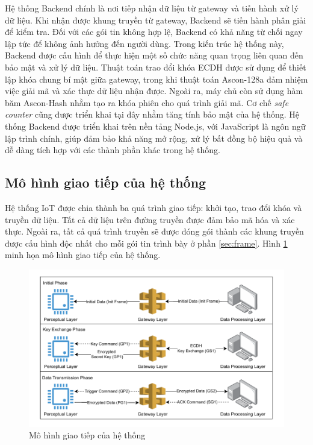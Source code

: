 Hệ thống Backend chính là nơi tiếp nhận dữ liệu từ gateway và tiến hành xử lý dữ liệu. Khi nhận được khung truyền từ gateway, Backend sẽ tiến hành phân giải để kiểm tra. Đối với các gói tin không hợp lệ, Backend có khả năng từ chối ngay lập tức để không ảnh hưởng đến người dùng. Trong kiến trúc hệ thống này, Backend được cấu hình để thực hiện một số chức năng quan trọng liên quan đến bảo mật và xử lý dữ liệu. Thuật toán trao đổi khóa ECDH được sử dụng để thiết lập khóa chung bí mật giữa gateway, trong khi thuật toán Ascon-128a đảm nhiệm việc giải mã và xác thực dữ liệu nhận được. Ngoài ra, máy chủ còn sử dụng hàm băm Ascon-Hash nhằm tạo ra khóa phiên cho quá trình giải mã. Cơ chế \textit{safe counter} cũng được triển khai tại đây nhằm tăng tính bảo mật của hệ thống. Hệ thống Backend được triển khai trên nền tảng Node.js, với JavaScript là ngôn ngữ lập trình chính, giúp đảm bảo khả năng mở rộng, xử lý bất đồng bộ hiệu quả và dễ dàng tích hợp với các thành phần khác trong hệ thống.


\subsection{Mô hình giao tiếp của hệ thống}
\label{sec:tongquan}
Hệ thống IoT được chia thành ba quá trình giao tiếp: khởi tạo, trao đổi khóa và truyền dữ liệu. Tất cả dữ liệu trên đường truyền được đảm bảo mã hóa và xác thực. Ngoài ra, tất cả quá trình truyền sẽ được đóng gói thành các khung truyền được cấu hình độc nhất cho mỗi gói tin trình bày ở phần \ref{sec:frame}. Hình \ref{fig:system} minh họa mô hình giao tiếp của hệ thống.

\begin{figure}[h]
    \centering
    \includegraphics[width=0.85\linewidth]{images/system.pdf}
    \caption{Mô hình giao tiếp của hệ thống}
    \label{fig:system}
\end{figure}

